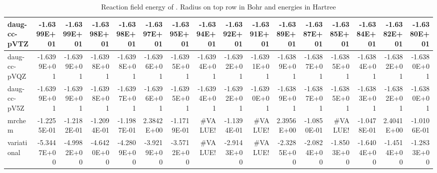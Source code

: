 \documentclass[../master_thesis.tex]{subfiles}
\begin{document}
\begin{table}
{{\begin{tabular}{|l|r|r|r|r|r|r|r|r|r|r|r|r|r|r|r|}
daug-cc-pVTZ & -1.6399E+01 & -1.6399E+01 & -1.6398E+01 & -1.6398E+01 & -1.6397E+01 & -1.6395E+01 & -1.6394E+01 & -1.6392E+01 & -1.6391E+01 & -1.6389E+01 & -1.6387E+01 & -1.6385E+01 & -1.6384E+01 & -1.6382E+01 & -1.6380E+01 \\ \hline
daug-cc-pVQZ & -1.6399E+01 & -1.6399E+01 & -1.6398E+01 & -1.6398E+01 & -1.6396E+01 & -1.6395E+01 & -1.6394E+01 & -1.6392E+01 & -1.6391E+01 & -1.6389E+01 & -1.6387E+01 & -1.6385E+01 & -1.6384E+01 & -1.6382E+01 & -1.6380E+01 \\ \hline
daug-cc-pV5Z & -1.6399E+01 & -1.6399E+01 & -1.6398E+01 & -1.6397E+01 & -1.6396E+01 & -1.6395E+01 & -1.6394E+01 & -1.6392E+01 & -1.6390E+01 & -1.6389E+01 & -1.6387E+01 & -1.6385E+01 & -1.6383E+01 & -1.6382E+01 & -1.6380E+01 \\ \hline
mrchem & -1.2255E-01 & -1.2182E-01 & -1.2094E-01 & -1.1987E-01 & 2.3842E+00 & -1.1719E-01 & \#VALUE! & -1.1394E-01 & \#VALUE! & 2.3956E+00 & -1.0850E-01 & \#VALUE! & -1.0478E-01 & 2.4041E+00 & -1.0106E-01 \\ \hline
variational & -5.3447E+00 & -4.9982E+00 & -4.6420E+00 & -4.2809E+00 & -3.9219E+00 & -3.5712E+00 & \#VALUE! & -2.9143E+00 & \#VALUE! & -2.3285E+00 & -2.0824E+00 & -1.8503E+00 & -1.6404E+00 & -1.4514E+00 & -1.2833E+00 \\ \hline
\end{tabular}}}{\caption{Reaction field energy of . Radius on top row in Bohr and energies in Hartree}
\label{tab:Erdatacyan}}


\end{table}
\end{document}
